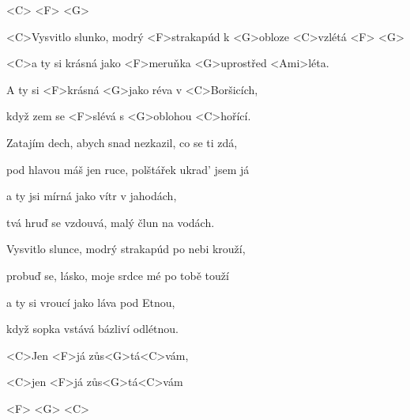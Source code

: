 

<C> <F> <G>

\zs
<C>Vysvitlo slunko, modrý <F>strakapúd k <G>obloze <C>vzlétá <F> <G>

<C>a ty si krásná jako <F>meruňka <G>uprostřed <Ami>léta.

A ty si <F>krásná <G>jako réva v <C>Boršicích,

když zem se <F>slévá s <G>oblohou <C>hořící.
\ks

\zs
{Zatajím} dech, abych snad {nezkazil,} {co} se ti {zdá,}

{pod} hlavou máš jen ruce, {polštářek} {ukrad'} jsem {já}

a ty jsi {mírná} {jako} vítr v {jahodách,}

tvá hruď se {vzdouvá}, {malý} člun {na} vodách.
\ks

\zs
{Vysvitlo} slunce, modrý {strakapúd} {po} nebi {krouží,}

{probuď} se, lásko, moje {srdce} mé {po} tobě {touží}

a ty si {vroucí} {jako} láva {pod} Etnou,

když sopka {vstává} {bázliví} {odlétnou.}
\ks

<C>Jen <F>já zůs<G>tá<C>vám,

<C>jen <F>já zůs<G>tá<C>vám

<F> <G> <C>

\kp





